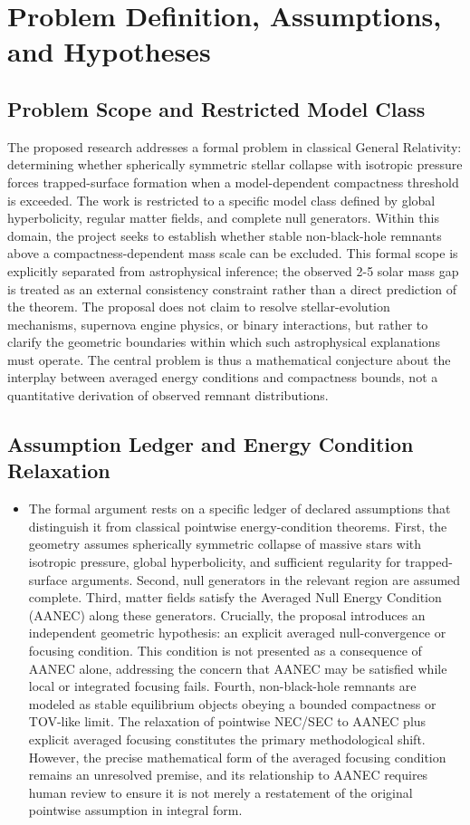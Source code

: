 \documentclass[conference]{IEEEtran}
\begin{document}
\section{Problem Definition, Assumptions, and Hypotheses}
\subsection{Problem Scope and Restricted Model Class}
The proposed research addresses a formal problem in classical General Relativity: determining whether spherically symmetric stellar collapse with isotropic pressure forces trapped-surface formation when a model-dependent compactness threshold is exceeded. The work is restricted to a specific model class defined by global hyperbolicity, regular matter fields, and complete null generators. Within this domain, the project seeks to establish whether stable non-black-hole remnants above a compactness-dependent mass scale can be excluded. This formal scope is explicitly separated from astrophysical inference; the observed 2-5 solar mass gap is treated as an external consistency constraint rather than a direct prediction of the theorem. The proposal does not claim to resolve stellar-evolution mechanisms, supernova engine physics, or binary interactions, but rather to clarify the geometric boundaries within which such astrophysical explanations must operate. The central problem is thus a mathematical conjecture about the interplay between averaged energy conditions and compactness bounds, not a quantitative derivation of observed remnant distributions.

\subsection{Assumption Ledger and Energy Condition Relaxation}
\begin{itemize}
\item The formal argument rests on a specific ledger of declared assumptions that distinguish it from classical pointwise energy-condition theorems. First, the geometry assumes spherically symmetric collapse of massive stars with isotropic pressure, global hyperbolicity, and sufficient regularity for trapped-surface arguments. Second, null generators in the relevant region are assumed complete. Third, matter fields satisfy the Averaged Null Energy Condition (AANEC) along these generators. Crucially, the proposal introduces an independent geometric hypothesis: an explicit averaged null-convergence or focusing condition. This condition is not presented as a consequence of AANEC alone, addressing the concern that AANEC may be satisfied while local or integrated focusing fails. Fourth, non-black-hole remnants are modeled as stable equilibrium objects obeying a bounded compactness or TOV-like limit. The relaxation of pointwise NEC/SEC to AANEC plus explicit averaged focusing constitutes the primary methodological shift. However, the precise mathematical form of the averaged focusing condition remains an unresolved premise, and its relationship to AANEC requires human review to ensure it is not merely a restatement of the original pointwise assumption in integral form.
\end{itemize}
\end{document}
